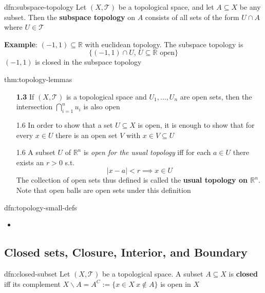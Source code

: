 \documentclass{article}
\begin{document}
\begin{dfn}{dfn:subspace-topology}{}
    Let $(X, \mathcal{T})$ be a topological space, and let $A \subseteq X$ be any subset. Then the \textbf{subspace topology} on $A$ consists of all sets of the form $U \cap A$ where $U \in \mathcal{T}$
\end{dfn}

\textbf{Example}: $(-1, 1) \subseteq \mathbb{R}$ with euclidean topology. The subspace topology is
\[\{(-1, 1) \cap U,\, U \subseteq \mathbb{R} \text{ open}\}\]
$(-1, 1)$ is closed in the subspace topology

\begin{thm}{thm:topology-lemmas}{}
    \begin{itemize}
        \item[\textbf{1.3}] If $(X, \mathcal{T})$ is a topological space and $U_{1},\dots,U_{n}$ are open sets, then the intersection $\bigcap_{i=1}^{n}u_{i}$ is also open
        \item[1.6] In order to show that a set $U \subseteq X$ is open, it is enough to show that for every $x\in U$ there is an open set $V$ with $x\in V \subseteq U$
        \item[1.6] A subset $U$ of $\mathbb{R}^{n}$ is \textit{open for the usual topology} iff for each $a\in U$ there exists an $r > 0$ s.t.
            \[\lvert x -a \rvert < r \implies x \in U\]
            The collection of open sets thus defined is called the \textbf{usual topology on $\mathbb{R}^{n}$}. Note that open balls are open sets under this definition
    \end{itemize}
\end{thm}

\begin{dfn}{dfn:topology-small-defs}{}
    \begin{itemize}
        \item
    \end{itemize}
\end{dfn}


\newpage

\subsection{Closed sets, Closure, Interior, and Boundary}

\begin{dfn}{dfn:closed-subset}{}
    Let $(X, \mathcal{T})$ be a topological space. A subset $A \subseteq X$ is \textbf{closed} iff its complement $X \backslash A = A^{C} := \{x \in X \ x\not\in A\}$ is open in $X$
\end{dfn}
\end{document}

